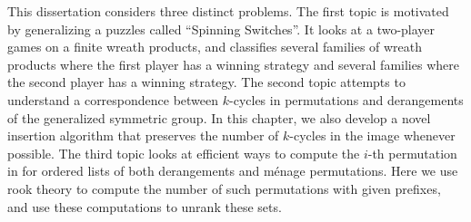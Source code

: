 This dissertation considers three distinct problems.
The first topic is motivated by generalizing a puzzles called
``Spinning Switches''. It looks at a two-player games on a finite wreath
products, and classifies several families of wreath products where
the first player has a winning strategy and several families where the
second player has a winning strategy.
The second topic attempts to understand a correspondence between
$k$-cycles in permutations and derangements of the generalized symmetric
group. In this chapter, we also develop a novel insertion algorithm that
preserves the number of $k$-cycles in the image whenever possible.
The third topic looks at efficient ways to compute the $i$-th permutation
in for ordered lists of both derangements and m\'enage permutations. Here
we use rook theory to compute the number of such permutations with given
prefixes, and use these computations to unrank these sets.
